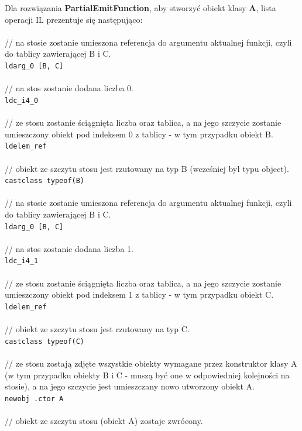\documentclass[12pt]{article}
\begin{document}
Dla rozwiązania \textbf{PartialEmitFunction}, aby stworzyć obiekt klasy \textbf{A}, lista operacji IL prezentuje się następująco: \\
\\
// na stosie zostanie umieszona referencja do argumentu aktualnej funkcji, czyli do tablicy zawierającej B i C.\\
\texttt{ldarg\_0 [B, C]}\\
\\
// na stos zostanie dodana liczba 0.\\
\texttt{ldc\_i4\_0}\\
\\
// ze stosu zostanie ściągnięta liczba oraz tablica, a na jego szczycie zostanie umieszczony obiekt pod indeksem 0 z tablicy - w tym przypadku obiekt B.\\
\texttt{ldelem\_ref}\\
\\
// obiekt ze szczytu stosu jest rzutowany na typ B (wcześniej był typu object).\\
\texttt{castclass typeof(B)}\\
\\
// na stosie zostanie umieszona referencja do argumentu aktualnej funkcji, czyli do tablicy zawierającej B i C.\\
\texttt{ldarg\_0 [B, C]}\\
\\
// na stos zostanie dodana liczba 1.\\
\texttt{ldc\_i4\_1}\\
\\
// ze stosu zostanie ściągnięta liczba oraz tablica, a na jego szczycie zostanie umieszczony obiekt pod indeksem 1 z tablicy - w tym przypadku obiekt C.\\
\texttt{ldelem\_ref}\\
\\
// obiekt ze szczytu stosu jest rzutowany na typ C.\\
\texttt{castclass typeof(C)}\\
\\
// ze stosu zostają zdjęte wszystkie obiekty wymagane przez konstruktor klasy A (w tym przypadku obiekty B i C - muszą być one w odpowiedniej kolejności na stosie), a na jego szczycie jest umieszczany nowo utworzony obiekt A.\\
\texttt{newobj .ctor A}\\
\\
// obiekt ze szczytu stosu (obiekt A) zostaje zwrócony.\\
\end{document}
